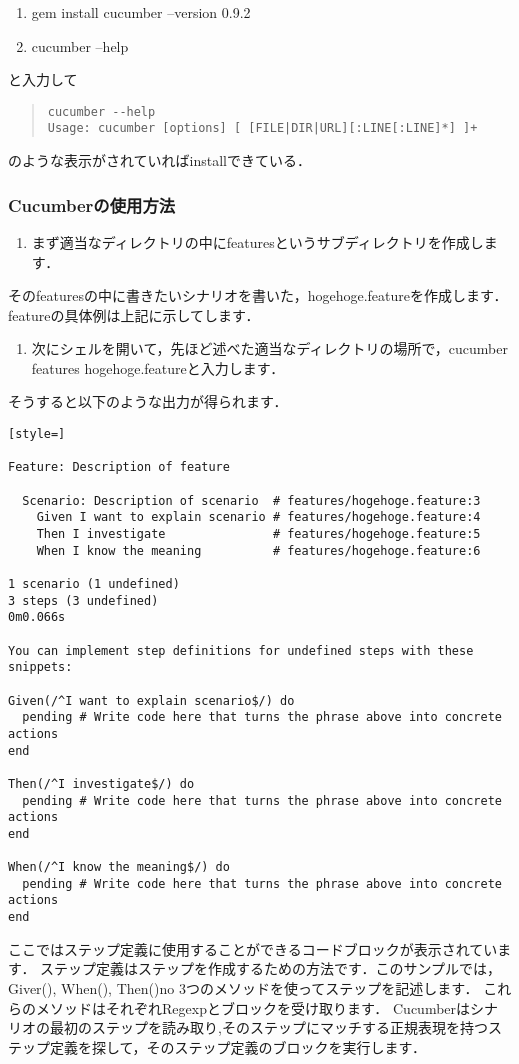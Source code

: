 \begin{enumerate}
\item gem install cucumber --version 0.9.2
\item cucumber --help
\end{enumerate}
と入力して
\begin{quote}\begin{verbatim}
cucumber --help
Usage: cucumber [options] [ [FILE|DIR|URL][:LINE[:LINE]*] ]+
\end{verbatim}\end{quote}
のような表示がされていればinstallできている．

\subsubsection{Cucumberの使用方法}
\begin{enumerate}
\item まず適当なディレクトリの中にfeaturesというサブディレクトリを作成します．
\end{enumerate}
そのfeaturesの中に書きたいシナリオを書いた，hogehoge.featureを作成します．
featureの具体例は上記に示してします．

\begin{enumerate}
\item 次にシェルを開いて，先ほど述べた適当なディレクトリの場所で，cucumber features hogehoge.featureと入力します．
\end{enumerate}
そうすると以下のような出力が得られます．
\begin{lstlisting}[style=]

Feature: Description of feature

  Scenario: Description of scenario  # features/hogehoge.feature:3
    Given I want to explain scenario # features/hogehoge.feature:4
    Then I investigate               # features/hogehoge.feature:5
    When I know the meaning          # features/hogehoge.feature:6

1 scenario (1 undefined)
3 steps (3 undefined)
0m0.066s

You can implement step definitions for undefined steps with these snippets:

Given(/^I want to explain scenario$/) do
  pending # Write code here that turns the phrase above into concrete actions
end

Then(/^I investigate$/) do
  pending # Write code here that turns the phrase above into concrete actions
end

When(/^I know the meaning$/) do
  pending # Write code here that turns the phrase above into concrete actions
end

\end{lstlisting}
ここではステップ定義に使用することができるコードブロックが表示されています．
ステップ定義はステップを作成するための方法です．このサンプルでは，Giver(), When(), Then()no
3つのメソッドを使ってステップを記述します．
これらのメソッドはそれぞれRegexpとブロックを受け取ります．
Cucumberはシナリオの最初のステップを読み取り,そのステップにマッチする正規表現を持つステップ定義を探して，そのステップ定義のブロックを実行します．

